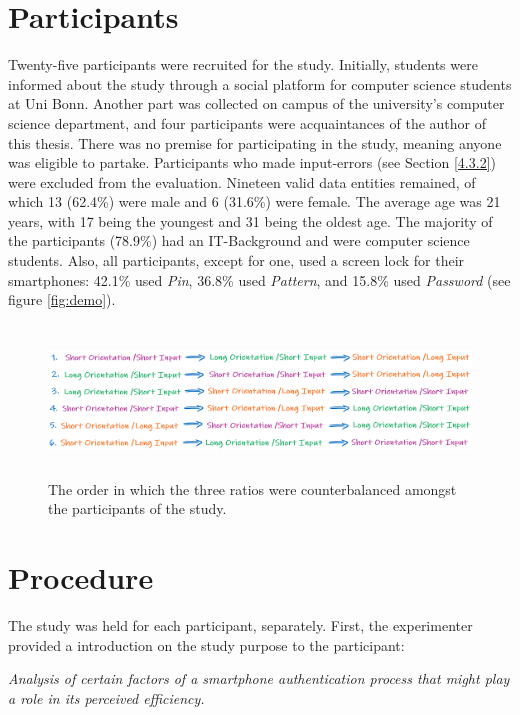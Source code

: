 \section{Participants} \label{5.2}

Twenty-five participants were recruited for the study. Initially, students were informed about the study through a social platform for computer science students at Uni Bonn. Another part was collected on campus of the university's computer science department, and four participants were acquaintances of the author of this thesis. There was no premise for participating in the study, meaning anyone was eligible to partake. Participants who made input-errors (see Section \ref{4.3.2}) were excluded from the evaluation. Nineteen valid data entities remained, of which 13 (62.4\%) were male and 6 (31.6\%) were female. The average age was 21 years, with 17 being the youngest and 31 being the oldest age. The majority of the participants (78.9\%) had an IT-Background and were computer science students. Also, all participants, except for one, used a screen lock for their smartphones: 42.1\% used \textit{Pin}, 36.8\% used \textit{Pattern}, and 15.8\% used \textit{Password} (see figure \ref{fig:demo}). 

\begin{figure}[t!]
\centering
\includegraphics[width=14cm, height=4cm]{Chapters/graphics/permutation.PNG}
\caption{The order in which the three ratios were counterbalanced amongst the participants of the study.}
\label{fig:permutation}
\end{figure}


\section{Procedure} \label{5.3}
The study was held for each participant, separately. First, the experimenter provided a introduction on the study purpose to the participant:

\begin{center}
\textit{Analysis of certain factors of a smartphone authentication process that might play a role in its perceived efficiency.}    
\end{center}

